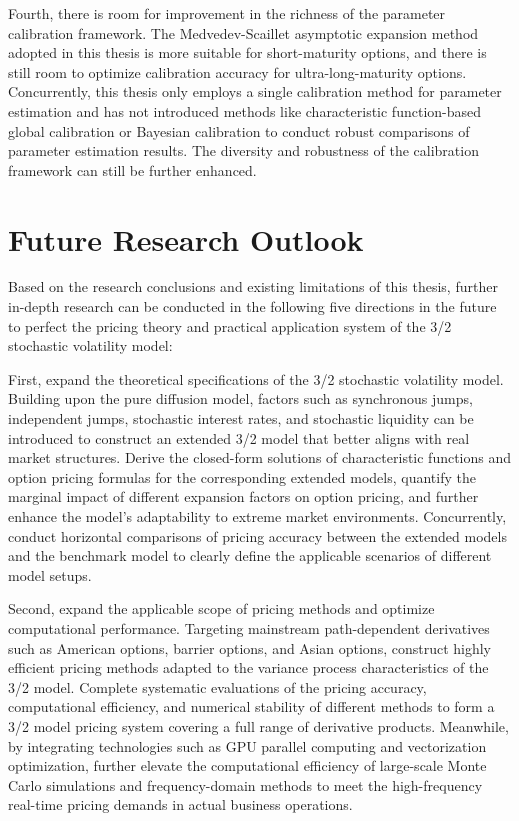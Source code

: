 Fourth, there is room for improvement in the richness of the parameter calibration framework. The Medvedev-Scaillet asymptotic expansion method adopted in this thesis is more suitable for short-maturity options, and there is still room to optimize calibration accuracy for ultra-long-maturity options. Concurrently, this thesis only employs a single calibration method for parameter estimation and has not introduced methods like characteristic function-based global calibration or Bayesian calibration to conduct robust comparisons of parameter estimation results. The diversity and robustness of the calibration framework can still be further enhanced.

\section{Future Research Outlook}

Based on the research conclusions and existing limitations of this thesis, further in-depth research can be conducted in the following five directions in the future to perfect the pricing theory and practical application system of the 3/2 stochastic volatility model:

First, expand the theoretical specifications of the 3/2 stochastic volatility model. Building upon the pure diffusion model, factors such as synchronous jumps, independent jumps, stochastic interest rates, and stochastic liquidity can be introduced to construct an extended 3/2 model that better aligns with real market structures. Derive the closed-form solutions of characteristic functions and option pricing formulas for the corresponding extended models, quantify the marginal impact of different expansion factors on option pricing, and further enhance the model's adaptability to extreme market environments. Concurrently, conduct horizontal comparisons of pricing accuracy between the extended models and the benchmark model to clearly define the applicable scenarios of different model setups.

Second, expand the applicable scope of pricing methods and optimize computational performance. Targeting mainstream path-dependent derivatives such as American options, barrier options, and Asian options, construct highly efficient pricing methods adapted to the variance process characteristics of the 3/2 model. Complete systematic evaluations of the pricing accuracy, computational efficiency, and numerical stability of different methods to form a 3/2 model pricing system covering a full range of derivative products. Meanwhile, by integrating technologies such as GPU parallel computing and vectorization optimization, further elevate the computational efficiency of large-scale Monte Carlo simulations and frequency-domain methods to meet the high-frequency real-time pricing demands in actual business operations.


